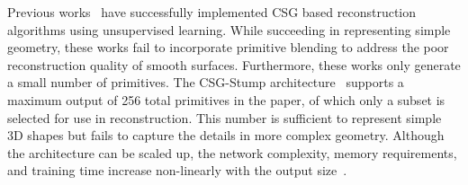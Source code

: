 Previous works~\cite{Sharma2018, Kania2020, Ren2021} have successfully implemented CSG based reconstruction algorithms using unsupervised learning. While succeeding in representing simple geometry, these works fail to incorporate primitive blending to address the poor reconstruction quality of smooth surfaces. Furthermore, these works only generate a small number of primitives. The CSG-Stump architecture~\cite{Ren2021} supports a maximum output of 256 total primitives in the paper, of which only a subset is selected for use in reconstruction. This number is sufficient to represent simple 3D shapes but fails to capture the details in more complex geometry. Although the architecture can be scaled up, the network complexity, memory requirements, and training time increase non-linearly with the output size~\cite{Ren2021}.

